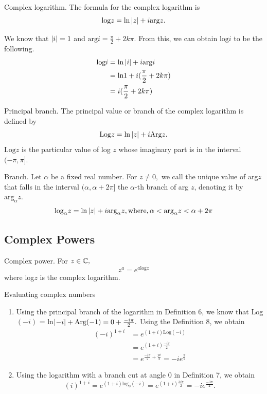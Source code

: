 \documentclass[11pt,reqno,oneside,a4paper]{article}
\begin{document}
\begin{defn}{Complex logarithm.}
The formula for the complex logarithm is $$\text{log}z = \text{ln} \left\lvert z\right\rvert + i\text{arg}z .$$
\end{defn}

\begin{eg}
We know that $\left\lvert i\right\rvert = 1$ and $\text{arg}i = \frac{\pi}{2} + 2k\pi.$ From this, we can obtain $\text{log}i$ to be the following.
	\begin{align*}
	\text{log}i &= \text{ln}\left\lvert i\right\rvert + i\text{arg}i\\
	&= \text{ln}1 + i(\frac{\pi}{2} + 2k\pi)\\
	&= i(\frac{\pi}{2} + 2k\pi)
	\end{align*}
\end{eg}

\begin{defn}{Principal branch.}
The principal value or branch of the complex logarithm is defined by 
$$\text{Log}z = \text{ln}\left\lvert z\right\rvert + i\text{Arg}z.$$
$\text{Log}z$ is the particular value of log $z$ whose imaginary part is in the interval $(-\pi,\pi]$. 
\end{defn}

\begin{defn}{Branch.}
Let $\alpha$ be a fixed real number. For $z \neq 0,$ we call the unique value of arg$z$ that falls in the interval $(\alpha,\alpha+2\pi]$ the $\alpha$-th branch of arg $z$, denoting it by $\text{arg}_\alpha z.$
$$\text{log}_\alpha z = \text{ln}\left\lvert z\right\rvert + i\text{arg}_\alpha z, \text{where}, \alpha < \text{arg}_\alpha z < \alpha+2\pi$$
\end{defn}

\subsection{Complex Powers}
\begin{defn}{Complex power.}
For $z \in \mathbb C,$ $$z^a = e^{a\text{log}z}$$ where log$z$ is the complex logarithm. 
\end{defn}

\begin{eg}{Evaluating complex numbers}
	\begin{enumerate}
	\item Using the principal branch of the logarithm in Definition 6, we know that Log$(-i)$ = ln$\left\lvert-i\right\rvert + \text{Arg}(-1) = 0+\frac{-i\pi}{2}.$ Using the Definition 8, we obtain
		\begin{align*}
		(-i)^{1+i} &= e^{(1+i)\text{Log}(-i)}\\
		&= e^{(1+i)\frac{-i\pi}{2}}\\
		&= e^{\frac{-i\pi}{2}+\frac{pi}{2}} = -ie^\frac{\pi}{2}
		\end{align*}
	\item Using the logarithm with a branch cut at angle $0$ in Definition 7, we obtain
		$$
		(i)^{1+i} = e^{(1+i)\text{log}_0(-i)} = e^{(1+i)\frac{3i\pi}{2}} = -ie^\frac{-3\pi}{2}.
		$$
	\end{enumerate}
\end{eg}
\end{document}
